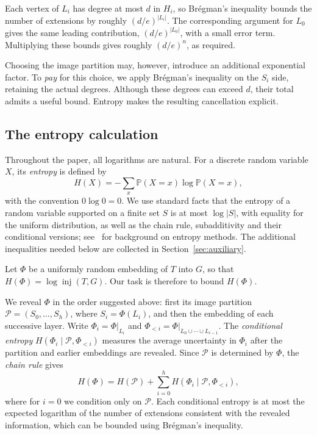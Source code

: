 \documentclass[10pt,a4paper]{amsart}
\numberwithin{equation}{section}
\theoremstyle{definition}
\theoremstyle{remark}
\DeclareMathOperator{\inj}{inj}
\begin{document}
Each vertex of $L_i$ has degree at most $d$ in $H_i$, so Br\'egman's inequality bounds the number of extensions by roughly $(d/e)^{|L_i|}$. The corresponding argument for $L_0$ gives the same leading contribution, $(d/e)^{|L_0|}$, with a small error term. Multiplying these bounds gives roughly $(d/e)^n$, as required.

Choosing the image partition may, however, introduce an additional exponential factor. To \emph{pay} for this choice, we apply Brégman’s inequality on the $S_i$ side, retaining the actual degrees. Although these degrees can exceed $d$, their total admits a useful bound. Entropy makes the resulting cancellation explicit.

\subsection{The entropy calculation}
Throughout the paper, all logarithms are natural. For a discrete random variable $X$, its \emph{entropy} is defined by
\[
    H(X)=-\sum_x \mathbb P(X=x)\log\mathbb P(X=x),
\]
with the convention $0\log 0=0$. We use standard facts that the entropy of a random variable supported on a finite set $S$ is at most $\log |S|$, with equality for the uniform distribution, as well as the chain rule, subadditivity and their conditional versions; see~\cite{SamotijEntropy} for background on entropy methods. The additional inequalities needed below are collected in Section~\ref{sec:auxiliary}. 

Let $\Phi$ be a uniformly random embedding of $T$ into $G$, so that $H(\Phi)=\log\inj(T,G)$. Our task is therefore to bound $H(\Phi)$.

We reveal $\Phi$ in the order suggested above: first its image
partition $\mathcal P=(S_0,\ldots,S_h)$, where $S_i=\Phi(L_i)$,
and then the embedding of each successive layer. Write
$\Phi_i=\Phi|_{L_i}$ and $\Phi_{<i} = \Phi|_{L_0\cup\cdots\cup L_{i-1}}$.
The \emph{conditional entropy} $H(\Phi_i\mid\mathcal P,\Phi_{<i})$ measures the average uncertainty in $\Phi_i$ after the partition and earlier embeddings are revealed. Since $\mathcal P$ is determined by $\Phi$, the \emph{chain rule} gives
\begin{equation}\label{eq:overview-chain}
    H(\Phi)=H(\mathcal P)
    +\sum_{i=0}^h H(\Phi_i\mid\mathcal P,\Phi_{<i}),
\end{equation}
where for $i=0$ we condition only on $\mathcal P$. Each conditional entropy is at most the expected logarithm of the number of extensions consistent with the revealed information, which can be bounded using Br\'egman's inequality.
\end{document}
